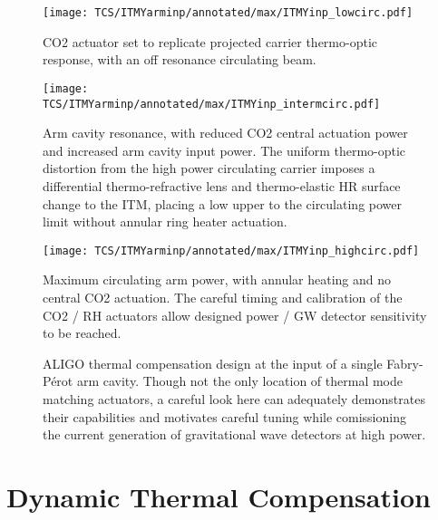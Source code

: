 \begin{figure}[H]
	\begin{subcaptiongroup}
		\centering
		\texttt{[image: TCS/ITMYarminp/annotated/max/ITMYinp\_lowcirc.pdf]}
		\caption{CO2 actuator set to replicate projected carrier thermo-optic response, with an off resonance circulating beam.}\label{subfig:TCSinp_lowcirc}
		\texttt{[image: TCS/ITMYarminp/annotated/max/ITMYinp\_intermcirc.pdf]}
		\caption{Arm cavity resonance, with reduced CO2 central actuation power and increased arm cavity input power. The uniform thermo-optic distortion from the high power circulating carrier imposes a differential thermo-refractive lens and thermo-elastic HR surface change to the ITM, placing a low upper to the circulating power limit without annular ring heater actuation.}\label{subfig:TCSinp_intcirc}
		\texttt{[image: TCS/ITMYarminp/annotated/max/ITMYinp\_highcirc.pdf]}
		\caption{Maximum circulating arm power, with annular heating and no central CO2 actuation. The careful timing and calibration of the CO2 / RH actuators allow designed power / GW detector sensitivity to be reached.}\label{subfig:TCSinp_highcirc}
	\end{subcaptiongroup}
	\caption{ALIGO thermal compensation design at the input of a single Fabry-P\'{e}rot arm cavity. Though not the only location of thermal mode matching actuators, a careful look here can adequately demonstrates their capabilities and motivates careful tuning while comissioning the current generation of gravitational wave detectors at high power.}
	\label{fig:TCSinp}
\end{figure}

\section{Dynamic Thermal Compensation}
